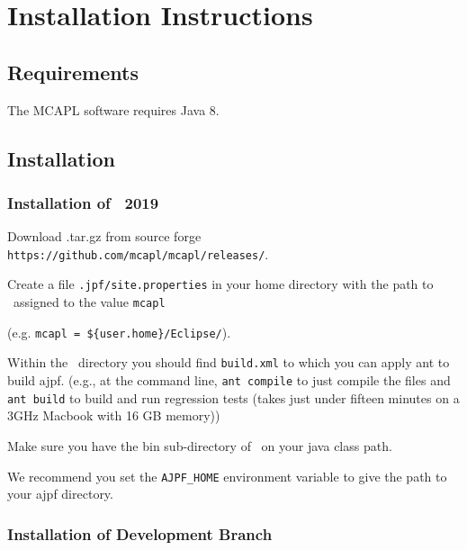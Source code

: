 \chapter{Installation Instructions}
\label{chap:installation}
\section{Requirements}

The MCAPL software requires Java 8.  

\section{Installation}

\subsection{Installation of \ajpf\ 2019}

\begin{itemize}
\begin{sloppypar}
\item Download \ajpfversion.tar.gz from source forge \texttt{https://github.com/mcapl/mcapl/releases/}.
\end{sloppypar}
\item Create a file \texttt{.jpf/site.properties} in your home directory with the path to \ajpfversion\ assigned to the value \texttt{mcapl}

  (e.g. \texttt{mcapl = \$\{user.home\}/Eclipse/\ajpfversion}).
\item Within the \ajpfversion\ directory you should find \texttt{build.xml} to which you can apply ant to build ajpf. (e.g., at the command line, \lstinline{ant compile} to just compile the files and \lstinline{ant build} to build and run regression tests (takes just under fifteen minutes on a 3GHz Macbook with 16 GB memory))
\item Make sure you have the bin sub-directory of \ajpfversion\ on your java class path.
\item We recommend you set the \texttt{AJPF\_HOME} environment variable to give the path to your ajpf directory.
\end{itemize}

\subsection{Installation of Development Branch}

